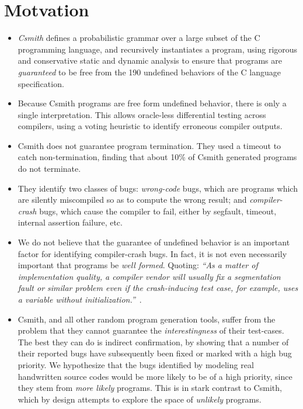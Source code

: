 \section{Motvation}\label{sec:motivation}

\begin{itemize}
	\item \emph{Csmith} defines a probabilistic grammar over a large subset of the C programming language, and recursively instantiates a program, using rigorous and conservative static and dynamic analysis to ensure that programs are \emph{guaranteed} to be free from the 190 undefined behaviors of the C language specification.
	\item Because Csmith programs are free form undefined behavior, there is only a single interpretation. This allows oracle-less differential testing across compilers, using a voting heuristic to identify erroneous compiler outputs.
	\item Csmith does not guarantee program termination. They used a timeout to catch non-termination, finding that about 10\% of Csmith generated programs do not terminate.
	\item They identify two classes of bugs: \emph{wrong-code} bugs, which are programs which are silently miscompiled so as to compute the wrong result; and \emph{compiler-crash} bugs, which cause the compiler to fail, either by segfault, timeout, internal assertion failure, etc.
	\item We do not believe that the guarantee of undefined behavior is an important factor for identifying compiler-crash bugs. In fact, it is not even necessarily important that programs be \emph{well formed}. Quoting: 
	\emph{``As a matter of implementation quality, a compiler vendor will usually fix a segmentation fault or similar problem even if the crash-inducing test case, for example, uses a variable without initialization.''}~\cite{Regehr2012a}.
	\item Csmith, and all other random program generation tools, suffer from the problem that they cannot guarantee the \emph{interestingness} of their test-cases. The best they can do is indirect confirmation, by showing that a number of their reported bugs have subsequently been fixed or marked with a high bug priority. We hypothesize that the bugs identified by modeling real handwritten source codes would be more likely to be of a high priority, since they stem from \emph{more likely} programs. This is in stark contrast to Csmith, which by design attempts to explore the space of \emph{unlikely} programs.

\end{itemize}
